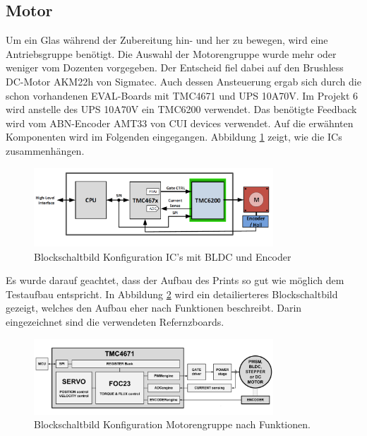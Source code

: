 \clearpage
\subsection{Motor}
\label{subsec:Motor}

Um ein Glas während der Zubereitung hin- und her zu bewegen, wird eine Antriebsgruppe benötigt. Die Auswahl der Motorengruppe wurde mehr oder weniger vom Dozenten vorgegeben. Der Entscheid fiel dabei auf den Brushless DC-Motor AKM22h von Sigmatec. Auch dessen Ansteuerung ergab sich durch die schon vorhandenen EVAL-Boards mit TMC4671 und UPS 10A70V. Im Projekt 6 wird anstelle des UPS 10A70V ein TMC6200 verwendet. Das benötigte Feedback wird vom ABN-Encoder AMT33 von CUI devices verwendet. Auf die erwähnten Komponenten wird im Folgenden eingegangen. Abbildung \ref{fig:Blockdiagramm_TMC4671_und_TMC6200} zeigt, wie die ICs zusammenhängen. 

\begin{figure}[H]
	\centering
	\includegraphics[width=0.8\textwidth]{graphics/Blockdiagramm_TMC4671_und_TMC6200}
	\caption{Blockschaltbild Konfiguration IC's mit BLDC und Encoder}
	\label{fig:Blockdiagramm_TMC4671_und_TMC6200}
\end{figure}

Es wurde darauf geachtet, dass der Aufbau des Prints so gut wie möglich dem Testaufbau entspricht. In Abbildung \ref{fig:Blockdiagramm_Motorengruppe} wird ein detailierteres Blockschaltbild gezeigt, welches den Aufbau eher nach Funktionen beschreibt. Darin eingezeichnet sind die verwendeten Refernzboards.

\begin{figure}[H]
	\centering
	\includegraphics[width=0.8\textwidth]{graphics/Blockdiagramm_Motorengruppe}
	\caption{Blockschaltbild Konfiguration Motorengruppe nach Funktionen.}
	\label{fig:Blockdiagramm_Motorengruppe}
\end{figure}

